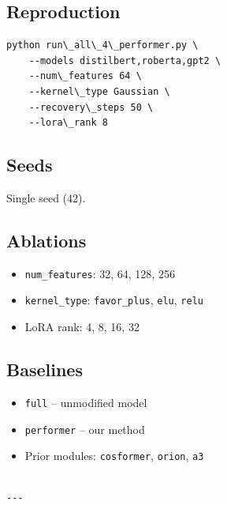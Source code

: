 \subsection{Reproduction}

\begin{lstlisting}
python run\_all\_4\_performer.py \
    --models distilbert,roberta,gpt2 \
    --num\_features 64 \
    --kernel\_type Gaussian \
    --recovery\_steps 50 \
    --lora\_rank 8
\end{lstlisting}

\subsection{Seeds}

Single seed (42).

\subsection{Ablations}

\begin{itemize}
\item \texttt{num\_features}: 32, 64, 128, 256
\item \texttt{kernel\_type}: \texttt{favor\_plus}, \texttt{elu}, \texttt{relu}
\item LoRA rank: 4, 8, 16, 32

\end{itemize}
\subsection{Baselines}

\begin{itemize}
\item \texttt{full} -- unmodified model
\item \texttt{performer} -- our method
\item Prior modules: \texttt{cosformer}, \texttt{orion}, \texttt{a3}
\end{itemize}
\begin{lstlisting}

---
\end{lstlisting}